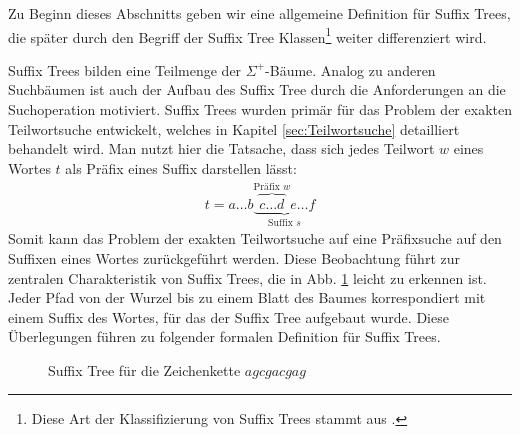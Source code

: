 \documentclass[12pt]{report}
\begin{document}
Zu Beginn dieses Abschnitts geben wir eine allgemeine Definition für Suffix Trees, die später durch den Begriff der Suffix Tree Klassen\footnote{Diese Art der Klassifizierung von Suffix Trees stammt aus \cite{Giegerich1995}.} weiter differenziert wird.

Suffix Trees bilden eine Teilmenge der $\Sigma^+$-Bäume. Analog zu anderen Suchbäumen ist auch der Aufbau des Suffix Tree durch die Anforderungen an die Suchoperation motiviert. Suffix Trees wurden primär für das Problem der exakten Teilwortsuche entwickelt, welches in Kapitel \ref{sec:Teilwortsuche} detailliert behandelt wird. Man nutzt hier die Tatsache, dass sich jedes Teilwort $w$ eines Wortes $t$ als Präfix eines Suffix darstellen lässt:
\begin{gather*}
    t = a \dots b \underbrace{\overbrace{c \dots d}^{\text{Präfix }w} e \dots f}_{\text{Suffix }s}
\end{gather*}
Somit kann das Problem der exakten Teilwortsuche auf eine Präfixsuche auf den Suffixen eines Wortes zurückgeführt werden. Diese Beobachtung führt zur zentralen Charakteristik von Suffix Trees, die in Abb. \ref{fig:suffixTreeAgcgacgag} leicht zu erkennen ist. Jeder Pfad von der Wurzel bis zu einem Blatt des Baumes korrespondiert mit einem Suffix des Wortes, für das der Suffix Tree aufgebaut wurde. Diese Überlegungen führen zu folgender formalen Definition für Suffix Trees.

\begin{figure}[htb]
\centering
{}
\medskip
\caption{Suffix Tree für die Zeichenkette $agcgacgag$}
\label{fig:suffixTreeAgcgacgag}
\end{figure}
\end{document}

